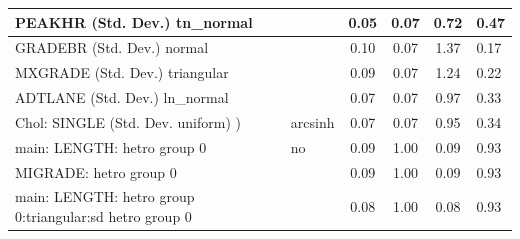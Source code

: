 \begin{table}
\begin{center}
\begin{tabular}{|l|l|c|c|c|l|}
			\hline
			PEAKHR (Std. Dev.) tn_normal &  & 0.05 & 0.07 & 0.72 & 0.47 \\
			\hline
			GRADEBR (Std. Dev.) normal &  & 0.10 & 0.07 & 1.37 & 0.17 \\
			\hline
			MXGRADE (Std. Dev.) triangular &  & 0.09 & 0.07 & 1.24 & 0.22 \\
			\hline
			ADTLANE (Std. Dev.) ln_normal &  & 0.07 & 0.07 & 0.97 & 0.33 \\
			\hline
			 Chol: SINGLE (Std. Dev. uniform) ) & arcsinh & 0.07 & 0.07 & 0.95 & 0.34 \\
			\hline
			main: LENGTH: hetro group 0 & no & 0.09 & 1.00 & 0.09 & 0.93 \\
			\hline
			MIGRADE: hetro group 0 &  & 0.09 & 1.00 & 0.09 & 0.93 \\
			\hline
			main: LENGTH: hetro group 0:triangular:sd  hetro group 0 &  & 0.08 & 1.00 & 0.08 & 0.93 \\
			\hline
		\end{tabular}
	\end{center}
\end{table}